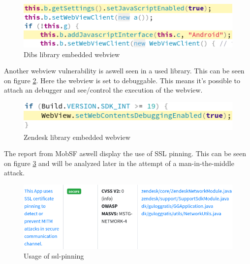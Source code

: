 \begin{figure}[htbp]
    \centering
    \includegraphics[width=1\columnwidth]{../static-analysis/pictures/dibs-javascript.png}
    \caption{Dibs library embedded webview}
    \label{fig:dibs-webview}
\end{figure}

Another webview vulnerability is aswell seen in a used library. This can be seen on figure \ref{fig:zendesk-webview}. Here the webview is set to debuggable. This means it's possible to attach an debugger and see/control the execution of the webview.    

\begin{figure}[htbp]
    \centering
    \includegraphics[width=1\columnwidth]{../static-analysis/pictures/zendesk-webview.png}
    \caption{Zendesk library embedded webview}
    \label{fig:zendesk-webview}
\end{figure}

The report from MobSF aswell display the use of SSL pinning. This can be seen on figure \ref{fig:ssl-pinning} and will be analyzed later in the attempt of a man-in-the-middle attack. 

\begin{figure}[htbp]
    \centering
    \includegraphics[width=1\columnwidth]{../static-analysis/pictures/ssl-pinning.png}
    \caption{Usage of ssl-pinning}
    \label{fig:ssl-pinning}
\end{figure}

